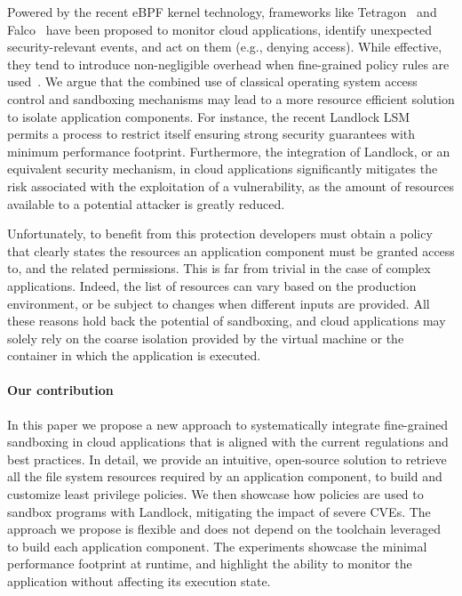 Powered by the recent eBPF kernel technology, frameworks like
Tetragon~\cite{tetragon} and Falco~\cite{falco} have been proposed to
monitor cloud applications, identify unexpected security-relevant
events, and act on them (e.g., denying access). While effective, they
tend to introduce non-negligible overhead when fine-grained policy
rules are used~\cite{falco-overhead}.  We argue that the combined use
of classical operating system access control and sandboxing mechanisms
may lead to a more resource efficient solution to isolate application
components.  For instance, the recent Landlock LSM~\cite{landlock}
permits a process to restrict itself ensuring strong security
guarantees with minimum performance footprint.  Furthermore, the
integration of Landlock, or an equivalent security mechanism, in cloud
applications significantly mitigates the risk associated with the
exploitation of a vulnerability, as the amount of resources available
to a potential attacker is greatly reduced.

Unfortunately, to benefit from this protection developers must obtain
a policy that clearly states the resources an application component
must be granted access to, and the related permissions. This is far
from trivial in the case of complex applications. Indeed, the list of
resources can vary based on the production environment, or be subject
to changes when different inputs are provided. All these reasons hold
back the potential of sandboxing, and cloud applications may solely
rely on the coarse isolation provided by the virtual machine or the
container in which the application is executed.

\paragraph*{Our contribution}
In this paper we propose a new approach to systematically integrate
fine-grained sandboxing in cloud applications that is aligned with the
current regulations and best practices. In detail, we provide an
intuitive, open-source solution to retrieve all the file system
resources required by an application component, to build and customize
least privilege policies. We then showcase how policies are used to
sandbox programs with Landlock, mitigating the impact of severe
CVEs. The approach we propose is flexible and does not depend on the
toolchain leveraged to build each application component. The
experiments showcase the minimal performance footprint at runtime, and
highlight the ability to monitor the application without affecting its
execution state.

